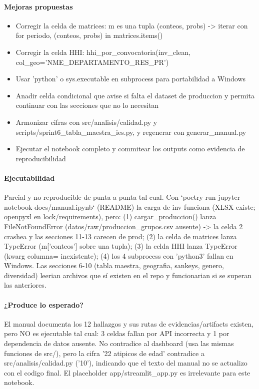 \paragraph{Mejoras propuestas}
\begin{itemize}
  \item Corregir la celda de matrices: m es una tupla (conteos, probs) -> iterar con for periodo, (conteos, probs) in matrices.items()
  \item Corregir la celda HHI: hhi\_por\_convocatoria(inv\_clean, col\_geo='NME\_DEPARTAMENTO\_RES\_PR')
  \item Usar 'python' o sys.executable en subprocess para portabilidad a Windows
  \item Anadir celda condicional que avise si falta el dataset de produccion y permita continuar con las secciones que no lo necesitan
  \item Armonizar cifras con src/analisis/calidad.py y scripts/sprint6\_tabla\_maestra\_ies.py, y regenerar con generar\_manual.py
  \item Ejecutar el notebook completo y commitear los outputs como evidencia de reproducibilidad
\end{itemize}

\paragraph{Ejecutabilidad}
Parcial y no reproducible de punta a punta tal cual. Con `poetry run jupyter notebook docs/manual.ipynb` (README) la carga de inv funciona (XLSX existe; openpyxl en lock/requirements), pero: (1) cargar\_produccion() lanza FileNotFoundError (datos/raw/produccion\_grupos.csv ausente) -> la celda 2 crashea y las secciones 11-13 carecen de prod; (2) la celda de matrices lanza TypeError (m['conteos'] sobre una tupla); (3) la celda HHI lanza TypeError (kwarg columna= inexistente); (4) los 4 subprocess con 'python3' fallan en Windows. Las secciones 6-10 (tabla maestra, geografia, sankeys, genero, diversidad) leerian archivos que sí existen en el repo y funcionarian si se superan las anteriores.

\paragraph{¿Produce lo esperado?}
El manual documenta los 12 hallazgos y sus rutas de evidencias/artifacts existen, pero NO es ejecutable tal cual: 3 celdas fallan por API incorrecta y 1 por dependencia de datos ausente. No contradice al dashboard (usa las mismas funciones de src/), pero la cifra '22 atipicos de edad' contradice a src/analisis/calidad.py ('10'), indicando que el texto del manual no se actualizo con el codigo final. El placeholder app/streamlit\_app.py es irrelevante para este notebook.

